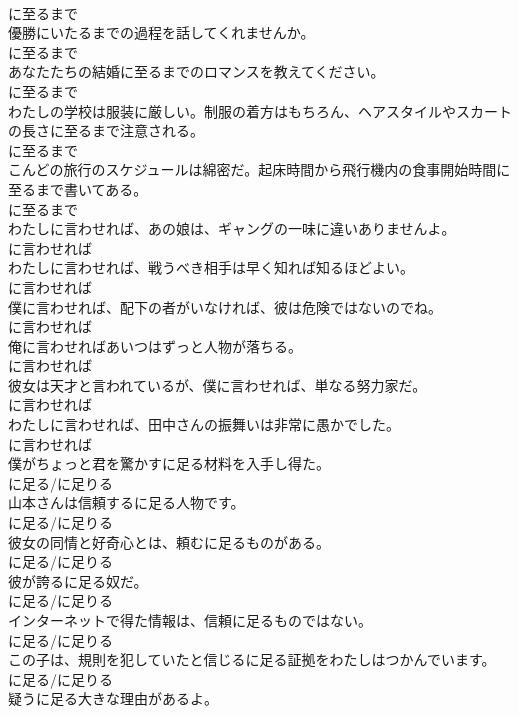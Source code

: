 \documentclass[8pt]{extreport}
\begin{document}
\begin{CJK}{UTF8}{min}
\\	に至るまで	
\\	優勝にいたるまでの過程を話してくれませんか。	
\\	に至るまで	
\\	あなたたちの結婚に至るまでのロマンスを教えてください。	
\\	に至るまで	
\\	わたしの学校は服装に厳しい。制服の着方はもちろん、ヘアスタイルやスカートの長さに至るまで注意される。	
\\	に至るまで	
\\	こんどの旅行のスケジュールは綿密だ。起床時間から飛行機内の食事開始時間に至るまで書いてある。	
\\	に至るまで	
\\	わたしに言わせれば、あの娘は、ギャングの一味に違いありませんよ。	
\\	に言わせれば	
\\	わたしに言わせれば、戦うべき相手は早く知れば知るほどよい。	
\\	に言わせれば	
\\	僕に言わせれば、配下の者がいなければ、彼は危険ではないのでね。	
\\	に言わせれば	
\\	俺に言わせればあいつはずっと人物が落ちる。	
\\	に言わせれば	
\\	彼女は天才と言われているが、僕に言わせれば、単なる努力家だ。	
\\	に言わせれば	
\\	わたしに言わせれば、田中さんの振舞いは非常に愚かでした。	
\\	に言わせれば	
\\	僕がちょっと君を驚かすに足る材料を入手し得た。	
\\	に足る/に足りる	
\\	山本さんは信頼するに足る人物です。	
\\	に足る/に足りる	
\\	彼女の同情と好奇心とは、頼むに足るものがある。	
\\	に足る/に足りる	
\\	彼が誇るに足る奴だ。	
\\	に足る/に足りる	
\\	インターネットで得た情報は、信頼に足るものではない。	
\\	に足る/に足りる	
\\	この子は、規則を犯していたと信じるに足る証拠をわたしはつかんでいます。	
\\	に足る/に足りる	
\\	疑うに足る大きな理由があるよ。	

\end{CJK}
\end{document}
